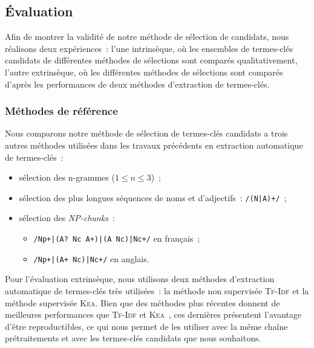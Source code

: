     \subsection{Évaluation}
    \label{subsec:main:domain_independent_keyphrase_extraction-keyphrase_candidate_selection-evaluation}
      Afin de montrer la validité de notre méthode de sélection de candidats,
      nous réalisons deux expériences~: l'une intrinsèque, où les ensembles de
      termes-clés candidats de différentes méthodes de sélections sont comparés
      qualitativement, l'autre extrinsèque, où les différentes méthodes de
      sélections sont comparés d'après les performances de deux méthodes
      d'extraction de termes-clés.

      \subsubsection{Méthodes de référence}
      \label{subsubsec:main:domain_independent_keyphrase_extraction-keyphrase_candidate_selection-evaluation-baselines}
        Nous comparons notre méthode de sélection de termes-clés candidats a
        trois autres méthodes utilisées dans les travaux précédents en
        extraction automatique de termes-clés~:
        \begin{itemize}
          \item{sélection des n-grammes ($1 \leq n \leq 3$)~;}
          \item{sélection des plus longues séquences de noms et d'adjectifs~:
                \texttt{/(N|A)+/}~;}
          \item{sélection des \textit{NP-chunks}~:}
          \begin{itemize}
            \item{\texttt{/Np+|(A? Nc A+)|(A Nc)|Nc+/} en français~;}
            \item{\texttt{/Np+|(A+ Nc)|Nc+/} en anglais.}
          \end{itemize}
        \end{itemize}

        Pour l'évaluation extrinsèque, nous utilisons deux méthodes d'extraction
        automatique de termes-clés très utilisées~: la méthode non supervisée
        \textsc{Tf-Idf} et la méthode supervisée \textsc{Kea}. Bien que des
        méthodes plus récentes donnent de meilleures performances que
        \textsc{Tf-Idf} et \textsc{Kea}~\cite{kim2010semeval}, ces dernières
        présentent l'avantage d'être reproductibles, ce qui nous permet de les
        utiliser avec la même chaîne prétraitements et avec les termes-clés
        candidats que nous souhaitons.

